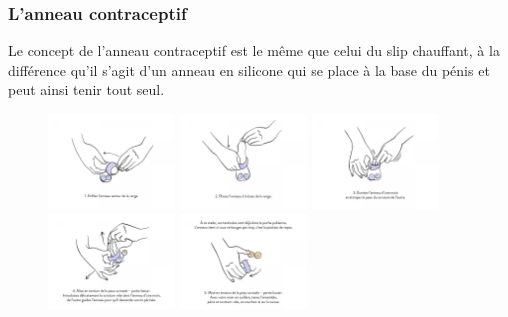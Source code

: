 \documentclass[12pt,a4paper]{report}
\begin{document}
\subsubsection{L'anneau contraceptif}

Le concept de l'anneau contraceptif est le même que celui du slip chauffant, à la différence qu'il s'agit d'un anneau en silicone qui se place à la base du pénis et peut ainsi tenir tout seul.

\begin{figure}[h]
    \centering
    \includegraphics[width=0.3\textwidth]{images/scientiphique/Tuto_andro_switch/1.png}
    \includegraphics[width=0.3\textwidth]{images/scientiphique/Tuto_andro_switch/2.png}
    \includegraphics[width=0.3\textwidth]{images/scientiphique/Tuto_andro_switch/3.png}
    \includegraphics[width=0.3\textwidth]{images/scientiphique/Tuto_andro_switch/4.png}
    \includegraphics[width=0.3\textwidth]{images/scientiphique/Tuto_andro_switch/5.png}

\end{figure}
\end{document}
